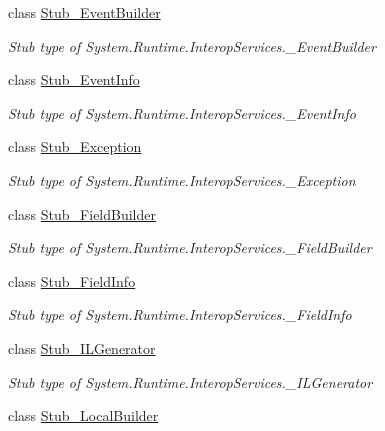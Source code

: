 \begin{DoxyCompactItemize}
class \hyperlink{class_system_1_1_runtime_1_1_interop_services_1_1_fakes_1_1_stub___event_builder}{Stub\-\_\-\-Event\-Builder}
\begin{DoxyCompactList}\small\item\em Stub type of System.\-Runtime.\-Interop\-Services.\-\_\-\-Event\-Builder\end{DoxyCompactList}\item 
class \hyperlink{class_system_1_1_runtime_1_1_interop_services_1_1_fakes_1_1_stub___event_info}{Stub\-\_\-\-Event\-Info}
\begin{DoxyCompactList}\small\item\em Stub type of System.\-Runtime.\-Interop\-Services.\-\_\-\-Event\-Info\end{DoxyCompactList}\item 
class \hyperlink{class_system_1_1_runtime_1_1_interop_services_1_1_fakes_1_1_stub___exception}{Stub\-\_\-\-Exception}
\begin{DoxyCompactList}\small\item\em Stub type of System.\-Runtime.\-Interop\-Services.\-\_\-\-Exception\end{DoxyCompactList}\item 
class \hyperlink{class_system_1_1_runtime_1_1_interop_services_1_1_fakes_1_1_stub___field_builder}{Stub\-\_\-\-Field\-Builder}
\begin{DoxyCompactList}\small\item\em Stub type of System.\-Runtime.\-Interop\-Services.\-\_\-\-Field\-Builder\end{DoxyCompactList}\item 
class \hyperlink{class_system_1_1_runtime_1_1_interop_services_1_1_fakes_1_1_stub___field_info}{Stub\-\_\-\-Field\-Info}
\begin{DoxyCompactList}\small\item\em Stub type of System.\-Runtime.\-Interop\-Services.\-\_\-\-Field\-Info\end{DoxyCompactList}\item 
class \hyperlink{class_system_1_1_runtime_1_1_interop_services_1_1_fakes_1_1_stub___i_l_generator}{Stub\-\_\-\-I\-L\-Generator}
\begin{DoxyCompactList}\small\item\em Stub type of System.\-Runtime.\-Interop\-Services.\-\_\-\-I\-L\-Generator\end{DoxyCompactList}\item 
class \hyperlink{class_system_1_1_runtime_1_1_interop_services_1_1_fakes_1_1_stub___local_builder}{Stub\-\_\-\-Local\-Builder}

\end{DoxyCompactItemize}
